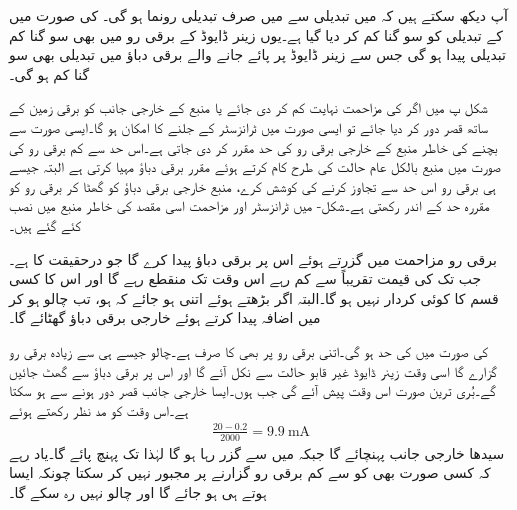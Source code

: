 آپ دیکھ سکتے ہیں کہ  میں  تبدیلی سے  میں صرف  تبدیلی رونما ہو گی۔ کی صورت میں  کے تبدیلی کو سو گنا کم کر دیا گیا ہے۔یوں زینر ڈایوڈ کے برقی رو میں بھی سو گنا کم تبدیلی پیدا ہو گی جس سے زینر ڈایوڈ پر پائے جانے والے برقی دباؤ میں تبدیلی بھی سو گنا کم ہو گی۔

شکل  پ میں اگر  کی مزاحمت نہایت کم کر دی جائے یا منبع کے خارجی جانب کو برقی زمین کے ساتھ قصر دور کر دیا جائے تو ایسی صورت میں ٹرانزسٹر کے جلنے کا امکان ہو گا۔ایسی صورت سے بچنے کی خاطر منبع کے خارجی برقی رو کی حد مقرر کر دی جاتی ہے۔اس حد سے کم برقی رو کی صورت میں منبع بالکل عام حالت کی طرح کام کرتے ہوئے مقرر برقی دباؤ مہیا کرتی ہے البتہ جیسے ہی برقی رو اس حد سے تجاوز کرنے کی کوشش کرے، منبع خارجی برقی دباؤ کو گھٹا کر برقی رو کو مقررہ حد کے اندر رکھتی ہے۔شکل- میں ٹرانزسٹر  اور مزاحمت  اسی مقصد کی خاطر منبع میں نصب کئے گئے ہیں۔

برقی رو مزاحمت  میں گزرتے ہوئے اس  پر  برقی دباؤ پیدا کرے گا جو درحقیقت  کا  ہے۔جب تک  کی قیمت تقریباً  سے کم رہے اس وقت تک  منقطع رہے گا اور اس کا کسی قسم کا کوئی کردار نہیں ہو گا۔البتہ اگر  بڑھتے ہوئے اتنی ہو جائے کہ  ہو، تب  چالو ہو کر  میں اضافہ پیدا کرتے ہوئے خارجی برقی دباؤ  گھٹائے گا۔

 کی صورت میں  کی حد  ہو گی۔اتنی برقی رو پر بھی  کا  صرف  ہے۔چالو  جیسے ہی  سے زیادہ برقی رو گزارے گا اسی وقت زینر ڈایوڈ غیر قابو حالت سے نکل آئے گا اور اس پر برقی دباؤ  سے گھٹ جائیں گے۔بُری ترین صورت اس وقت پیش آئے گی جب  ہوں۔ایسا خارجی جانب قصر دور ہونے سے ہو سکتا ہے۔اس وقت  کو مد نظر رکھتے ہوئے 
\begin{align*}
\frac{20-0.2}{2000}=\SI{9.9}{\milli \ampere}
\end{align*}
سیدھا خارجی جانب پہنچائے گا جبکہ   میں سے  گزر رہا ہو گا لہٰذا  تک پہنچ پائے گا۔یاد رہے کہ  کسی صورت بھی  کو  سے کم برقی رو گزارنے پر مجبور نہیں کر سکتا چونکہ ایسا ہوتے ہی   ہو جائے گا اور  چالو نہیں رہ سکے گا۔

